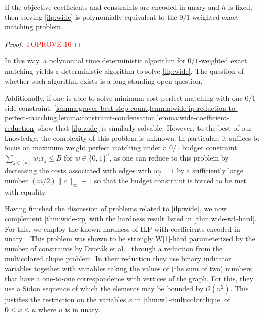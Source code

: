 \documentclass[a4paper,UKenglish,cleveref,thm-restate]{lipics-v2021}
\newcommand{\veczero}{\mathbf0}
\renewcommand{\O}{\mathcal O}
\begin{document}
\begin{proposition}
    If the objective coefficients and constraints are encoded in unary and $h$ is fixed, then solving \cref{ilp:wide} is polynomially equivalent to the $0/1$-weighted exact matching problem.
    \label{thm:wide-ip-exact-matching-equivalence}
\end{proposition}

\begin{proof}\textcolor{red}{TOPROVE 16}\end{proof}

In this way, a polynomial time deterministic algorithm for $0/1$-weighted exact matching yields a deterministic algorithm to solve \cref{ilp:wide}. The question of whether such algorithm exists is a long standing open question.

Additionally, if one is able to solve minimum cost perfect matching with one $0/1$ side constraint, \cref{lemma:graver-best-step-count,lemma:wide-ip-reduction-to-perfect-matching,lemma:constraint-condensation,lemma:wide-coefficient-reduction} show that \cref{ilp:wide} is similarly solvable. However, to the best of our knowledge, the complexity of this problem is unknown. In particular, it suffices to focus on maximum weight perfect matching under a $0/1$ budget constraint $\sum_{j\in[n]}w_jx_j\le B$ for $w\in\{0,1\}^n$, as one can reduce to this problem by decreasing the costs associated with edges with $w_j=1$ by a sufficiently large number $(m/2)\|c\|_\infty+1$ so that the budget constraint is forced to be met with equality.

Having finished the discussion of problems related to \cref{ilp:wide}, we now complement \cref{thm:wide-xp} with the hardness result listed in \cref{thm:wide-w1-hard}. For this, we employ the known hardness of ILP with coefficients encoded in unary~\cite{DBLP:journals/ai/DvorakEGKO21}. This problem was shown to be strongly W[1]-hard parameterized by the number of constraints by Dvorák et al.~\cite{DBLP:journals/ai/DvorakEGKO21} through a reduction from the multicolored clique problem. In their reduction they use binary indicator variables together with variables taking the values of (the sum of two) numbers that have a one-to-one correspondence with vertices of the graph. For this, they use a Sidon sequence of which the elements may be bounded by $\O(n^2)$. This justifies the restriction on the variables $x$ in \cref{thm:w1-multicolorclique} of $\veczero\le x\le u$ where $u$ is in unary.

\thmwonemulticolorclique*
\end{document}
